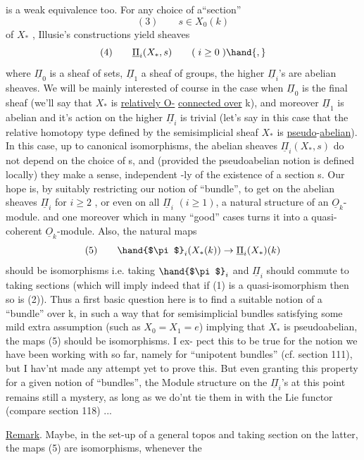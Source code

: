is a weak equivalence too. 
For any choice of a``section''
\[ (3) \qquad s \in X_0(k) \]
of $X_*$ , Illusie's constructions yield sheaves
\[ (4) \qquad \underline{\Pi}_i(X_*,s) \qquad ( \; i \geq 0 \; )\hand{,} \]
where $\underline{\Pi}_0$ is a sheaf of sets, $\underline{\Pi}_1$ a sheaf of groups,   the higher
$\underline{\Pi}_i$'s  are abelian sheaves. We will be mainly interested of course in the
case when $\underline{\Pi}_0$ is the final sheaf (we'll say that $X_*$ is \uline{relatively O-}
\uline{connected over} k), and moreover $\underline{\Pi}_1$ is abelian and it's action on
the higher $\underline{\Pi}_i$ is trivial (let's say in this case that the relative
homotopy type defined by the semisimplicial sheaf $X_*$ is \uline{pseudo}-\uline{abelian}).
In this case, up to canonical isomorphisms, the  abelian
sheaves $\underline{\Pi}_i(X_*,s)$ do not depend on the choice of s, and (provided the
pseudoabelian notion is defined locally) they make a sense, independent%
-ly  of the existence  of a section s. Our hope is, by suitably
restricting our notion of ``bundle'', to get on the abelian sheaves $\underline{\Pi}_i$
for $i \geq 2$ , or even on all $\underline{\Pi}_i$ $(i \geq 1)$, a natural structure of an
$\underline{O}_k$-module.  and one moreover which in many ``good'' cases turns it
into a quasi-coherent $\underline{O}_k$-module. Also, the natural maps
\[ (5) \qquad \hand{$\pi$}_i(X_*(k)) \to \underline{\Pi}_i(X_*)(k) \]
should be isomorphisms\hand{,} i.e. taking $\hand{$\pi$}_i$ and $\underline{\Pi}_i$ should commute to taking
sections (which will imply indeed that if (1) is a quasi-isomorphism
then so is (2)). Thus a first basic question here is to find a suitable
notion of a ``bundle'' over k, in such a way that for semisimplicial
bundles satisfying some mild extra assumption (such as $X_0=X_1=e$) implying
that $X_*$ is pseudoabelian, the maps (5) should be isomorphisms. I ex-%
pect this to be true for the notion we have been working with so far,
namely for ``unipotent bundles'' (cf. section 111), but I hav'nt made
any attempt yet to prove this. But even granting this property for
a given notion of ``bundles'', the Module structure on the $\underline{\Pi}_i$'s at this
point remains still a mystery,\unsure{\hand{$^*$}} as long as we do'nt tie them in with the
Lie functor (compare section 118) ...

\uline{Remark}. Maybe, in the set-up of a general topos  and taking section on
the latter, the maps (5) are isomorphisms, whenever the 

